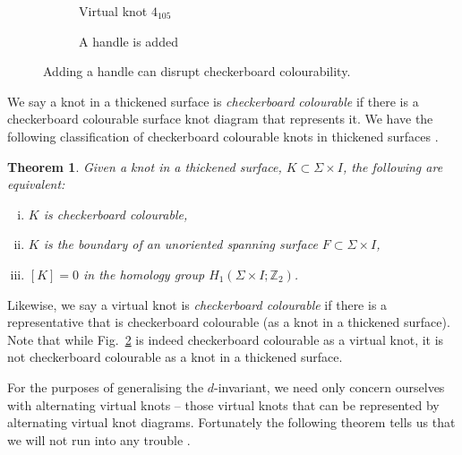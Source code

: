 \documentclass[12pt]{report}
\newcommand{\Z}{\mathbb{Z}}
\newtheorem*{theorem}{Theorem}
\begin{document}
\begin{figure}[hbt]
	\centering
	\hspace*{\fill}
	\begin{subfigure}[b]{0.4 \textwidth}
		\centering
		\def\svgscale{0.35}
		
		\caption{Virtual knot $4_{105}$}
		\label{fig:4-105-vknot}
	\end{subfigure}
	\hspace*{\fill}	\hspace*{\fill}	\hspace*{\fill}
	\begin{subfigure}[b]{0.4 \textwidth}
		\centering
		\def\svgscale{0.35}
		
		\caption{A handle is added}
		\label{fig:4-105-vknot-with-handle}
	\end{subfigure}
	\hspace*{\fill} 
	\caption{Adding a handle can disrupt checkerboard colourability.}
	\label{fig:adding-handle-to-4-105}
\end{figure}

We say a knot in a thickened surface is \textit{checkerboard colourable} if there is a checkerboard colourable surface knot diagram that represents it. We have the following classification of checkerboard colourable knots in thickened surfaces \cite{minimal-diagrams-surface-links}.

\begin{theorem}
Given a knot in a thickened surface, $K \subset \Sigma \times I$, the following are equivalent:
	\begin{enumerate}[(i)]
	\item $K$ is checkerboard colourable,
	\item $K$ is the boundary of an unoriented spanning surface $F \subset \Sigma \times I$,
	\item $[K] = 0$ in the homology group $H_{1}(\Sigma \times I; \Z_{2})$.
	\end{enumerate} 
\end{theorem}

Likewise, we say a virtual knot is \textit{checkerboard colourable} if there is a representative that is checkerboard colourable (as a knot in a thickened surface). Note that while Fig.~\ref{fig:4-105-vknot-with-handle} is indeed checkerboard colourable as a virtual knot, it is not checkerboard colourable as a knot in a thickened surface.

For the purposes of generalising the $d$-invariant, we need only concern ourselves with alternating virtual knots -- those virtual knots that can be represented by alternating virtual knot diagrams. Fortunately the following theorem tells us that we will not run into any trouble \cite{jones-polynomial-checkerboard-colourable}.
\end{document}
